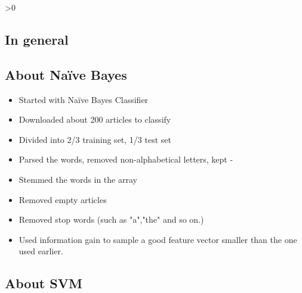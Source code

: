 
\ifnum\printdraft>0
	\subsection{In general}
	\subsection{About Naïve Bayes}
	\begin{itemize}
		\item Started with Naïve Bayes Classifier
		\item Downloaded about 200 articles to classify
		\item Divided into 2/3 training set, 1/3 test set
		\item Parsed the words, removed non-alphabetical letters, kept -
		\item Stemmed the words in the array
		\item Removed empty articles
		\item Removed stop words (such as "a","the" and so on.)
		\item Used information gain to sample a good feature vector smaller than the one used earlier.
	\end{itemize}
	\subsection{About SVM}
\fi
